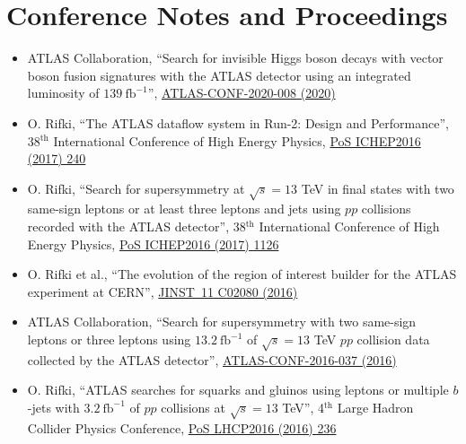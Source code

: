 \documentclass[a4paper,10pt]{article}
\begin{document}
\vspace{3mm}
\section{Conference Notes and Proceedings}

\begin{itemize}
	\item ATLAS Collaboration,
	``Search for invisible Higgs boson decays with vector boson fusion signatures with the ATLAS detector using an integrated luminosity of  $139\ \mathrm{fb}^{-1}$'',
	\href{https://atlas.web.cern.ch/Atlas/GROUPS/PHYSICS/CONFNOTES/ATLAS-CONF-2020-008/}{ATLAS-CONF-2020-008 (2020)}
	\item O. Rifki,
	``The ATLAS dataflow system in Run-2: Design and Performance'',
	38$^{\mathrm{th}}$ International Conference of High Energy Physics,
	\href{https://pos.sissa.it/282/240/pdf}{PoS ICHEP2016 (2017) 240}
	\item O. Rifki,
	``Search for supersymmetry at $\sqrt{s} = 13$ TeV in final states with two same-sign leptons or at least three leptons and jets using $pp$ collisions recorded with the ATLAS detector'',
	38$^{\mathrm{th}}$ International Conference of High Energy Physics,
	\href{https://pos.sissa.it/282/1126/pdf}{PoS ICHEP2016 (2017) 1126}
  \item O. Rifki et al.,
  ``The evolution of the region of interest builder for the ATLAS experiment at CERN'',
  \href{https://iopscience.iop.org/article/10.1088/1748-0221/11/02/C02080}{JINST\ 11 C02080 (2016) }
	\item ATLAS Collaboration,
	``Search for supersymmetry with two same-sign leptons or three leptons using $13.2\ \mathrm{fb}^{-1}$ of $\sqrt{s} = 13$ TeV $pp$ collision data collected by the ATLAS detector'',
	\href{https://atlas.web.cern.ch/Atlas/GROUPS/PHYSICS/CONFNOTES/ATLAS-CONF-2016-037/}{ATLAS-CONF-2016-037 (2016)}
	\item O. Rifki,
	``ATLAS searches for squarks and gluinos using leptons or multiple $b$-jets with $3.2\ \mathrm{fb}^{-1}$ of $pp$ collisions at $\sqrt{s} = 13$ TeV'',
	4$^{\mathrm{th}}$ Large Hadron Collider Physics Conference,
	\href{https://pos.sissa.it/276/236/pdf}{PoS LHCP2016 (2016) 236}
\end{itemize}

\vspace{3mm}
\end{document}
